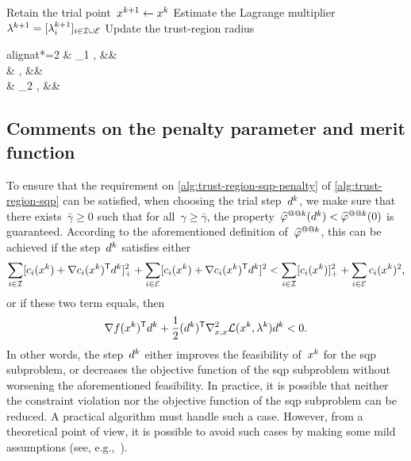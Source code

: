 \begin{algorithm}
{{        }{
            Retain the trial point~$\iter[k + 1] \gets \iter[k]$\;
        }
        Estimate the Lagrange multiplier~$\lm[k + 1] = [\lm[k + 1]_i]_{i \in \iub \cup \ieq}$\;
        Update the trust-region radius
        \begin{algoempheq}[left={\rad[k + 1] \gets \empheqlbrace}]{alignat*=2}
            & \theta_1 \rad[k],  && \quad {}\\
            & \rad[k],           && \quad {}\\
            & \theta_2 \rad[k],  && \quad {}
        \end{algoempheq}
    }
\end{algorithm}

\subsection{Comments on the penalty parameter and merit function}
\label{subsec:penalty-parameter-merit-function}

To ensure that the requirement on \cref{alg:trust-region-sqp-penalty} of \cref{alg:trust-region-sqp} can be satisfied, when choosing the trial step~$\step[k]$, we make sure that there exists~$\bar{\gamma} \ge 0$ such that for all~$\gamma \ge \bar{\gamma}$, the property~$\meritm[k](\step[k]) < \meritm[k](0)$ is guaranteed.
According to the aforementioned definition of~$\meritm[k]$, this can be achieved if the step~$\step[k]$ satisfies either
\begin{equation*}
    \sum_{i \in \iub} \posp{\con{i}(\iter[k]) + \nabla \con{i}(\iter[k])^{\T} \step[k]}^2 + \sum_{i \in \ieq} [\con{i}(\iter[k]) + \nabla \con{i}(\iter[k])^{\T} \step[k]]^2 < \sum_{i \in \iub} \posp{\con{i}(\iter[k])}^2 + \sum_{i \in \ieq} \con{i}(\iter[k])^2,
\end{equation*}
or if these two term equals, then
\begin{equation*}
    \nabla \obj(\iter[k])^{\T} \step[k] + \frac{1}{2} (\step[k])^{\T} \nabla_{x, x}^2 \lag(\iter[k], \lm[k]) \step[k] < 0.
\end{equation*}
In other words, the step~$\step[k]$ either improves the feasibility of~$\iter[k]$ for the \gls{sqp} subproblem, or decreases the objective function of the \gls{sqp} subproblem without worsening the aforementioned feasibility.
In practice, it is possible that neither the constraint violation nor the objective function of the \gls{sqp} subproblem can be reduced.
A practical algorithm must handle such a case.
However, from a theoretical point of view, it is possible to avoid such cases by making some mild assumptions (see, e.g.,~\cite[Asm.~3.1]{Powell_Yuan_1991}).

